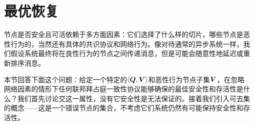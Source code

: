 \section{最优恢复}\label{sec:resilience}

节点是否安全且可活依赖于多方面因素：它们选择了什么样的{\quorum}切片，哪些节点是恶性行为的，当然还有具体的共识协议和网络行为。像对待通常的异步系统一样，我们假设系统最终将在良性行为的节点之间传递消息，但是可能会随意性地延迟或重新排序消息。

本节回答下面这个问题：给定一个特定的$\langle{\bm Q},{\bm V}\rangle$和恶性行为节点子集${\bm V}$，在忽略网络因素的情形下任何联邦拜占庭一致性协议能够确保的最佳安全性和存活性是什么？我们首先讨论{\quorum}交这一属性，没有它安全性是无法保证的。接着我们引入可去集的概念——这是一个错误节点的集合，不考虑它们系统仍然有可能保持安全性和存活性。



